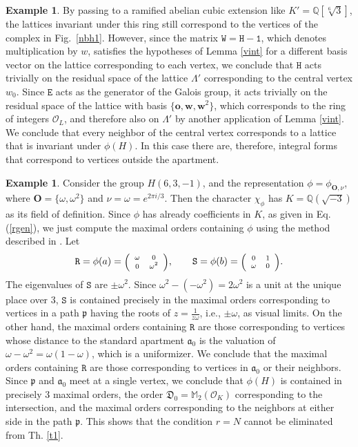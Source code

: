 \documentclass{article}
\newcommand\sbmattrix[4]{\textnormal{\scriptsize$\left(\begin{array}{cc}#1&#2\\#3&#4\end{array}\right)$\normalsize}}
\theoremstyle{definition}
\newtheorem{ex}[prop]{Example}
\begin{document}
\begin{ex}
  By passing to a ramified abelian cubic extension like
  $K'=\mathbb{Q}[\sqrt[6]3]$, the lattices invariant under this ring still 
  correspond to the vertices of the complex in Fig.~\ref{nbh1}. However,
  since the matrix $\mathtt{W}=\mathtt{H}-\mathtt{1}$, which denotes 
  multiplication by $w$, satisfies the hypotheses of Lemma
  \ref{vint} for a different basis vector on the lattice corresponding
  to each vertex, we conclude that $\mathtt{H}$ acts trivially on
  the residual space of the lattice $\Lambda'$ corresponding to the 
  central vertex $w_0$. Since $\mathtt{E}$
  acts as the generator of the Galois group, it acts trivially
  on the residual space of the lattice with basis 
  $\{\mathbf{o},\mathbf{w},\mathbf{w}^2\}$, which corresponds
  to the ring of integers $\mathcal{O}_L$, and therefore also
  on $\Lambda'$ by another application of Lemma \ref{vint}.
  We conclude that every neighbor of the central vertex
  corresponds to a lattice that is invariant under $\phi(H)$.
  In this case there are, therefore, integral forms that correspond to 
  vertices outside the apartment.
\end{ex}


\begin{ex}
Consider the group $H(6,3,-1)$, and the representation
$\phi=\phi_{\mathbf{O},\nu}$, where $\mathbf{O}=\{\omega,\omega^2\}$
and $\nu=\omega=e^{2\pi i/3}$. Then the character $\chi_\phi$ has 
$K=\mathbb{Q}(\sqrt{-3})$ as its field of definition. 
Since $\phi$ has already coefficients in $K$, as given 
in Eq. (\ref{rgen}), we just compute the maximal orders
containing $\phi$ using the method described in \cite{AAS}. Let
$$\mathtt{R}=\phi(a)=\sbmattrix \omega00{\omega^2},\qquad
\mathtt{S}=\phi(b)=\sbmattrix 01\omega0.$$
The eigenvalues of $\mathtt{S}$ are $\pm\omega^2$.
Since $\omega^2-(-\omega^2)=2\omega^2$ is a unit
at the unique place over $3$, $\mathtt{S}$ is contained precisely 
in the maximal orders corresponding to vertices in a path $\mathfrak{p}$
having the roots of $z=\frac1{z\omega}$, i.e., $\pm\omega$, 
as visual limits. On the other hand, the maximal orders
containing $\mathtt{R}$ are those corresponding to vertices
whose distance to the standard apartment $\mathfrak{a}_0$ 
is the valuation of $\omega-\omega^2=\omega(1-\omega)$, 
which is a uniformizer. We conclude that the maximal orders
containing $\mathtt{R}$ are those corresponding to vertices
in $\mathfrak{a}_0$ or their neighbors. Since $\mathfrak{p}$
and $\mathfrak{a}_0$ meet at a single vertex, we conclude that
$\phi(H)$ is contained in precisely $3$ maximal orders,
the order $\mathfrak{D}_0=\mathbb{M}_2(\mathcal{O}_K)$ 
corresponding to the intersection, and the maximal orders
corresponding to the neighbors at either side in the path
$\mathfrak{p}$. This shows that the condition $r=N$ cannot be eliminated
from Th. \ref{t1}.
\end{ex}
 
\end{document}
